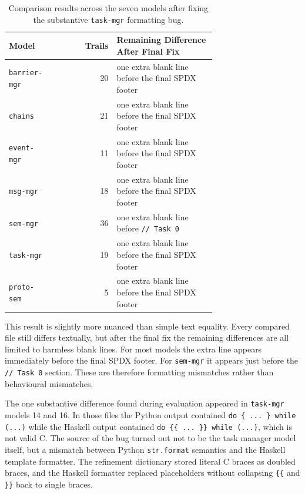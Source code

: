 \begin{table}[H]
\begin{center}
\begin{tabular}{|p{0.22\linewidth}|r|p{0.48\linewidth}|}
\hline
\textbf{Model} & \textbf{Trails} & \textbf{Remaining Difference After Final Fix} \\
\hline
\texttt{barrier-mgr} & 20 & one extra blank line before the final SPDX footer \\
\hline
\texttt{chains} & 21 & one extra blank line before the final SPDX footer \\
\hline
\texttt{event-mgr} & 11 & one extra blank line before the final SPDX footer \\
\hline
\texttt{msg-mgr} & 18 & one extra blank line before the final SPDX footer \\
\hline
\texttt{sem-mgr} & 36 & one extra blank line before \texttt{// Task 0} \\
\hline
\texttt{task-mgr} & 19 & one extra blank line before the final SPDX footer \\
\hline
\texttt{proto-sem} & 5 & one extra blank line before the final SPDX footer \\
\hline
\end{tabular}
\end{center}
\caption[Comparison results across the seven models]{Comparison results across the seven models after fixing the substantive \texttt{task-mgr} formatting bug.}
\label{tab:refine-compare-results}
\end{table}

This result is slightly more nuanced than simple text equality. Every compared file still differs textually, but after the final fix the remaining differences are all limited to harmless blank lines. For most models the extra line appears immediately before the final SPDX footer. For \texttt{sem-mgr} it appears just before the \texttt{// Task 0} section. These are therefore formatting mismatches rather than behavioural mismatches.

The one substantive difference found during evaluation appeared in \texttt{task-mgr} models 14 and 16. In those files the Python output contained \texttt{do \{ ... \} while (...)} while the Haskell output contained \texttt{do \{\{ ... \}\} while (...)}, which is not valid C. The source of the bug turned out not to be the task manager model itself, but a mismatch between Python \texttt{str.format} semantics and the Haskell template formatter. The refinement dictionary stored literal C braces as doubled braces, and the Haskell formatter replaced placeholders without collapsing \texttt{\{\{} and \texttt{\}\}} back to single braces.

